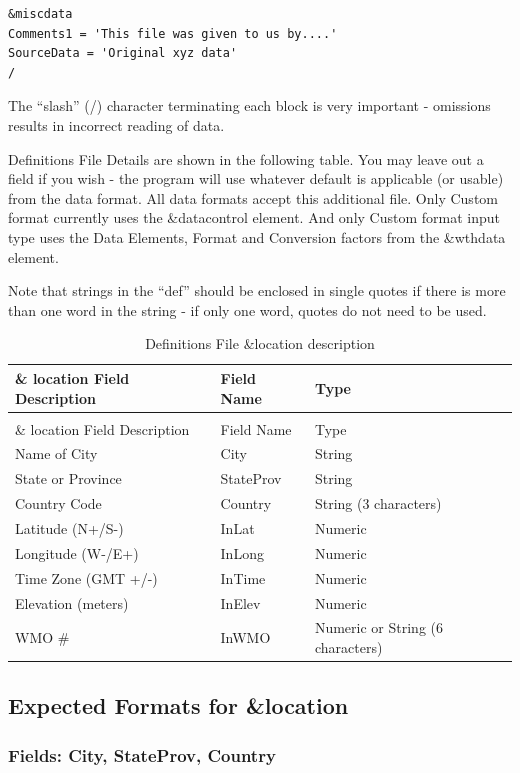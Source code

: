 \begin{lstlisting}
&miscdata
Comments1 = 'This file was given to us by....'
SourceData = 'Original xyz data'
/
\end{lstlisting}

The ``slash'' (/) character terminating each block is very important - omissions results in incorrect reading of data.

Definitions File Details are shown in the following table. You may leave out a field if you wish - the program will use whatever default is applicable (or usable) from the data format. All data formats accept this additional file. Only Custom format currently uses the \&datacontrol element. And only Custom format input type uses the Data Elements, Format and Conversion factors from the \&wthdata element.

Note that strings in the ``def'' should be enclosed in single quotes if there is more than one word in the string - if only one word, quotes do not need to be used.

\begin{longtable}[c]{p{2.12in}p{1.5in}p{2.37in}}
\caption{Definitions File \&location description \label{table:definitions-file-location-description}} \tabularnewline
\toprule 
\& location Field Description & Field Name & Type \tabularnewline
\midrule
\endfirsthead

\caption[]{Definitions File \&location description} \tabularnewline
\toprule 
\& location Field Description & Field Name & Type \tabularnewline
\midrule
\endhead

Name of City & City & String \tabularnewline
State or Province & StateProv & String \tabularnewline
Country Code & Country & String (3 characters) \tabularnewline
Latitude (N+/S-) & InLat & Numeric \tabularnewline
Longitude (W-/E+) & InLong & Numeric \tabularnewline
Time Zone (GMT +/-) & InTime & Numeric \tabularnewline
Elevation (meters) & InElev & Numeric \tabularnewline
WMO \# & InWMO & Numeric or String (6 characters) \tabularnewline
\bottomrule
\end{longtable}

\subsection{Expected Formats for \&location}\label{expected-formats-for-location}

\subsubsection{Fields: City, StateProv, Country}\label{fields-city-stateprov-country}

